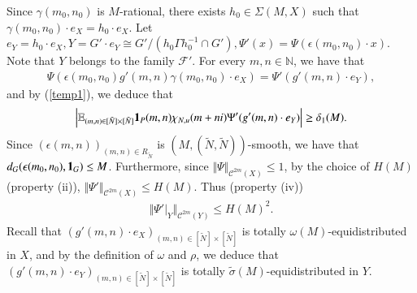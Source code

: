 \documentclass[12pt,amstex]{amsart}
\theoremstyle{definition}
\def \d {\delta}
\def \e {\epsilon}
\def \R {R_{\tilde{N}}}
\begin{document}
Since $\gamma(m_{0},n_{0})$ is $M$-rational, there exists $h_{0}\in\Sigma(M,X)$ such that $\gamma(m_{0},n_{0})\cdot e_{X}=h_{0}\cdot e_{X}$. Let
$e_{Y}=h_{0}\cdot e_{X}, Y=G'\cdot e_{Y}\cong G'/(h_{0}\Gamma h_{0}^{-1}\cap G'), \Psi'(x)=\Psi(\e(m_{0},n_{0})\cdot x)$. Note that $Y$ belongs to the family $\mathcal{F}'$. For every $m,n\in\mathbb{N}$, we have that
\begin{equation}\nonumber
   \begin{split}
   \Psi(\e(m_{0},n_{0})g'(m,n)\gamma(m_{0},n_{0})\cdot e_{X})=\Psi'(g'(m,n)\cdot e_{Y}),
  \end{split}
  \end{equation}
  and by (\ref{temp1}), we deduce that
  \begin{equation}\label{temp2}
   \begin{split}
   \Bigl\vert\mathbb{E}_{(m,n)\in [\tilde{N}]\times[\tilde{N}]}\bold{1}_{P}(m,n)\chi_{N,u}(m+ni)\Psi'(g'(m,n)\cdot e_{Y})\Bigr\vert\geq\d_{1}(M).
  \end{split}
  \end{equation}
Since $(\e(m,n))_{(m,n)\in\R}$ is $(M,(\tilde{N},\tilde{N}))$-smooth, we have that $d_{G}(\e(m_{0},n_{0}),\bold{1}_{G})\leq M$. Furthermore, since $\Vert\Psi\Vert_{\mathcal{C}^{2m}(X)}\leq 1$, by the choice of $H(M)$ (property (ii)), $\Vert\Psi'\Vert_{\mathcal{C}^{2m}(X)}\leq H(M)$.
Thus (property (iv))
\begin{equation}\nonumber
   \begin{split}
   \Vert\Psi'|_{Y}\Vert_{\mathcal{C}^{2m}(Y)}\leq H(M)^{2}.
  \end{split}
  \end{equation}
Recall that $(g'(m,n)\cdot e_{X})_{(m,n)\in[\tilde{N}]\times[\tilde{N}]}$ is totally $\omega(M)$-equidistributed in $X$, and by the definition of $\omega$ and $\rho$, we deduce that $(g'(m,n)\cdot e_{Y})_{(m,n)\in[\tilde{N}]\times[\tilde{N}]}$ is totally $\tilde{\sigma}(M)$-equidistributed in $Y$.
\end{document}
